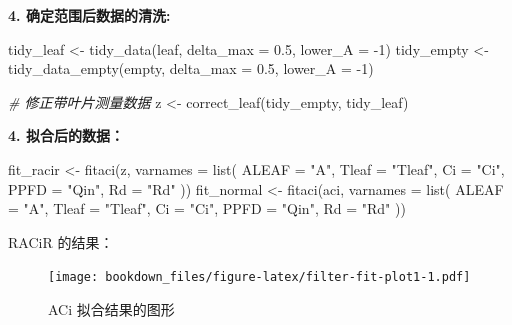 \documentclass[
]{krantz}
\makeatletter
\newenvironment{Shaded}{\begin{snugshade}}{\end{snugshade}}
\newcommand{\AttributeTok}[1]{\textcolor[rgb]{0.77,0.63,0.00}{#1}}
\newcommand{\CommentTok}[1]{\textcolor[rgb]{0.56,0.35,0.01}{\textit{#1}}}
\newcommand{\DecValTok}[1]{\textcolor[rgb]{0.00,0.00,0.81}{#1}}
\newcommand{\FloatTok}[1]{\textcolor[rgb]{0.00,0.00,0.81}{#1}}
\newcommand{\FunctionTok}[1]{\textcolor[rgb]{0.00,0.00,0.00}{#1}}
\newcommand{\NormalTok}[1]{#1}
\newcommand{\OtherTok}[1]{\textcolor[rgb]{0.56,0.35,0.01}{#1}}
\newcommand{\SpecialCharTok}[1]{\textcolor[rgb]{0.00,0.00,0.00}{#1}}
\newcommand{\StringTok}[1]{\textcolor[rgb]{0.31,0.60,0.02}{#1}}
\newenvironment{kframe}{%
\medskip{}
\setlength{\fboxsep}{.8em}
 \def\at@end@of@kframe{}%
 \ifinner\ifhmode%
  \def\at@end@of@kframe{\end{minipage}}%
  \begin{minipage}{\columnwidth}%
 \fi\fi%
 \def\FrameCommand##1{\hskip\@totalleftmargin \hskip-\fboxsep
 \colorbox{shadecolor}{##1}\hskip-\fboxsep
     \hskip-\linewidth \hskip-\@totalleftmargin \hskip\columnwidth}%
 \MakeFramed {\advance\hsize-\width
   \@totalleftmargin\z@ \linewidth\hsize
   \@setminipage}}%
 {\par\unskip\endMakeFramed%
 \at@end@of@kframe}
\renewenvironment{Shaded}{\begin{kframe}}{\end{kframe}}
\makeatother
\begin{document}
\textbf{4. 确定范围后数据的清洗:}

\begin{Shaded}
\begin{Highlighting}[]
\NormalTok{tidy\_leaf }\OtherTok{\textless{}{-}} \FunctionTok{tidy\_data}\NormalTok{(leaf, }\AttributeTok{delta\_max =} \FloatTok{0.5}\NormalTok{, }\AttributeTok{lower\_A =} \SpecialCharTok{{-}}\DecValTok{1}\NormalTok{)}
\NormalTok{tidy\_empty }\OtherTok{\textless{}{-}} \FunctionTok{tidy\_data\_empty}\NormalTok{(empty, }\AttributeTok{delta\_max =} \FloatTok{0.5}\NormalTok{, }\AttributeTok{lower\_A =} \SpecialCharTok{{-}}\DecValTok{1}\NormalTok{)}

\CommentTok{\# 修正带叶片测量数据}
\NormalTok{z }\OtherTok{\textless{}{-}} \FunctionTok{correct\_leaf}\NormalTok{(tidy\_empty, tidy\_leaf)}
\end{Highlighting}
\end{Shaded}

\textbf{4. 拟合后的数据：}

\begin{Shaded}
\begin{Highlighting}[]
\NormalTok{fit\_racir }\OtherTok{\textless{}{-}} \FunctionTok{fitaci}\NormalTok{(z,}
               \AttributeTok{varnames =}
                 \FunctionTok{list}\NormalTok{(}
                   \AttributeTok{ALEAF =} \StringTok{"A"}\NormalTok{,}
                   \AttributeTok{Tleaf =} \StringTok{"Tleaf"}\NormalTok{,}
                   \AttributeTok{Ci =} \StringTok{"Ci"}\NormalTok{,}
                   \AttributeTok{PPFD  =} \StringTok{"Qin"}\NormalTok{,}
                   \AttributeTok{Rd =} \StringTok{"Rd"}
\NormalTok{                ))}
\NormalTok{fit\_normal }\OtherTok{\textless{}{-}} \FunctionTok{fitaci}\NormalTok{(aci,}
               \AttributeTok{varnames =}
                 \FunctionTok{list}\NormalTok{(}
                   \AttributeTok{ALEAF =} \StringTok{"A"}\NormalTok{,}
                   \AttributeTok{Tleaf =} \StringTok{"Tleaf"}\NormalTok{,}
                   \AttributeTok{Ci =} \StringTok{"Ci"}\NormalTok{,}
                   \AttributeTok{PPFD  =} \StringTok{"Qin"}\NormalTok{,}
                   \AttributeTok{Rd =} \StringTok{"Rd"}
\NormalTok{                 ))}
\end{Highlighting}
\end{Shaded}

RACiR 的结果：

\begin{figure}
\centering
\texttt{[image: bookdown\_files/figure-latex/filter-fit-plot1-1.pdf]}
\caption{\label{fig:filter-fit-plot1}ACi 拟合结果的图形}
\end{figure}
\end{document}
